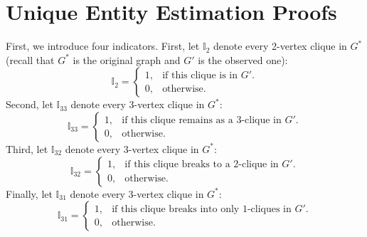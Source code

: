 \documentclass{imsart}
\begin{document}
\section{Unique Entity Estimation Proofs}
\label{sec:app}
First, we introduce four indicators.
%
First, let $\mathbb{I}_2$ denote every 2-vertex clique in $G^*$ (recall that $G^*$ is the original graph and $G'$ is the observed one):
	\begin{equation}
	\mathbb{I}_2=\begin{cases}
	1, & \text{if this clique is in } G'.\\
	0, & \text{otherwise}.
	\end{cases}
	\end{equation}
Second, let 	
$\mathbb{I}_{33}$ denote every 3-vertex clique in $G^*$:
	\begin{equation}
	\mathbb{I}_{33}=\begin{cases}
	1, & \text{if this clique remains as a 3-clique in } G'.\\
	0, & \text{otherwise}.
	\end{cases}
	\end{equation}
Third, let
$\mathbb{I}_{32}$ denote every 3-vertex clique in $G^*$:
	\begin{equation}
	\mathbb{I}_{32}=\begin{cases}
	1, & \text{if this clique breaks to a 2-clique in } G'.\\
	0, & \text{otherwise}.
	\end{cases}
	\end{equation}
Finally, let
$\mathbb{I}_{31}$ denote every 3-vertex clique in $G^*$:
	\begin{equation}
	\mathbb{I}_{31}=\begin{cases}
	1, & \text{if this clique breaks into only 1-cliques in } G'.\\
	0, & \text{otherwise}.
	\end{cases}
	\end{equation}
	
\end{document}
